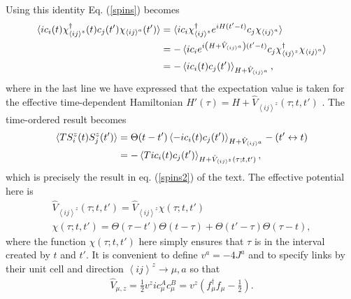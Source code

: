 \documentclass[aps,pra,preprint,groupedaddress]{revtex4-1}
\newcommand{\1}{\mathds{1}}
\begin{document}
Using this identity Eq. (\ref{spins}) becomes
\begin{align}
\braket{i c_i(t) \chi_{\left<ij\right>^z}^\dagger(t) c_j(t')\chi_{\left<ij\right>^a}(t')} & = \braket{ i c_i \chi_{\left<ij\right>^z}^\dagger e^{i H (t'-t)} c_j \chi_{\left<ij\right>^a} } \nonumber\\ 
&= - \braket{ i c_i e^{i \left( H + \hat{V}_{\left<ij\right>^a}\right) (t'-t)} c_j \chi_{\left<ij\right>^z}^\dagger \chi_{\left<ij\right>^a} } \nonumber\\
& = - \braket{ i c_i(t) c_j(t') }_{H + \hat{V}_{\left<ij\right>^a}},
\end{align}
where in the last line we have expressed that the expectation value is taken for the effective time-dependent Hamiltonian $H'(\tau) = H+\hat{V}_{\left<ij\right>^z}(\tau;t,t')$ \cite{Baskaran}. The time-ordered result becomes 
\begin{align}
\braket{T S_i^z(t) S^z_j(t')} & = \Theta(t-t') \braket{ -i c_i(t) c_j(t') }_{H + \hat{V}_{\left<ij\right>^a}} - (t' \leftrightarrow t) \nonumber \\
&= -\braket{T i c_i(t) c_j(t') }_{H+\hat{V}_{\left<ij\right>^z}(\tau;t,t')},
\end{align}
which is precisely the result in eq. (\ref{spins2}) of the text.
The effective potential here is
\begin{align} \label{Veff}
\hat{V}_{\left<ij\right>^z}(\tau;t,t') = \hat{V}_{\left<ij\right>^z} \chi(\tau;t,t') \nonumber \\
\chi(\tau;t,t') = \Theta(\tau - t') \Theta(t-\tau) + \Theta(t' - \tau) \Theta(\tau-t),
\end{align}
where the function $\chi(\tau;t,t')$ here simply ensures that $\tau$ is in the interval created by $t$ and $t'$. It is convenient to define \cite{Knolle} $v^a = -4 J^a$ and to specify links by their unit cell and direction ${\left<ij\right>^z} \to \mu, a$ so that
\begin{align}
\hat{V}_{\mu,z} = \frac{1}{2} v^z i c^A_\mu c^B_\mu = v^z \left(f_\mu^\dagger f_\mu - \frac{1}{2}\right).
\end{align}
\end{document}
